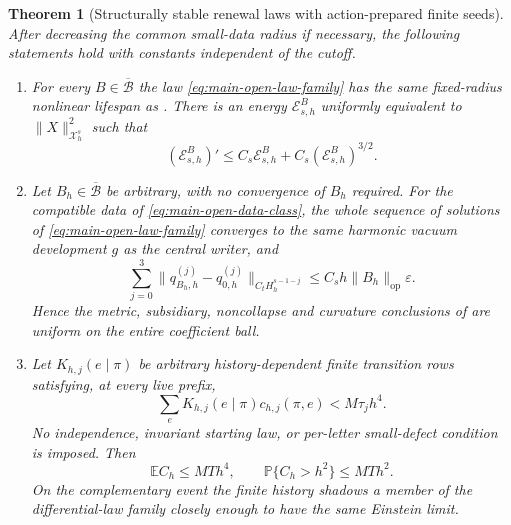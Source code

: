 \documentclass[11pt]{article}
\newtheorem{theorem}{Theorem}[section]
\numberwithin{equation}{section}
\theoremstyle{definition}
\theoremstyle{remark}
\newcommand{\op}{\mathrm{op}}
\begin{document}
\begin{theorem}[Structurally stable renewal laws with action-prepared finite seeds]
\label{thm:main-open-law-basin}
After decreasing the common small-data radius if necessary, the following
statements hold with constants independent of the cutoff.
\begin{enumerate}[label=\textup{(L\arabic*)},leftmargin=3em]
\item For every $B\in\overline{\mathcal B}$ the law
      \eqref{eq:main-open-law-family} has the same fixed-radius nonlinear
      lifespan as .  There is an energy
      $\mathscr E^B_{s,h}$ uniformly equivalent to
      $\|X\|_{\mathcal X_h^s}^2$ such that
      \begin{equation}
       (\mathscr E^B_{s,h})'
       \le C_s\mathscr E^B_{s,h}
          +C_s(\mathscr E^B_{s,h})^{3/2}.
       \label{eq:main-law-energy}
      \end{equation}
\item Let $B_h\in\overline{\mathcal B}$ be arbitrary, with no convergence of
      $B_h$ required.  For the compatible data of
      \eqref{eq:main-open-data-class}, the whole sequence of solutions of
      \eqref{eq:main-open-law-family} converges to the same harmonic vacuum
      development $g$ as the central writer, and
      \begin{equation}
       \sum_{j=0}^3
       \|q_{B_h,h}^{(j)}-q_{0,h}^{(j)}\|_{C_tH_h^{s-1-j}}
          \le C_sh\|B_h\|_{\op}\varepsilon.
       \label{eq:main-law-jet-comparison}
      \end{equation}
      Hence the metric, subsidiary, noncollapse and curvature conclusions of
       are uniform on the entire coefficient ball.
\item Let $K_{h,j}(e\mid\pi)$ be arbitrary history-dependent finite transition
      rows satisfying, at every live prefix,
      \begin{equation}
       \sum_eK_{h,j}(e\mid\pi)c_{h,j}(\pi,e)<M\tau_jh^4.
       \label{eq:main-law-row-moment}
      \end{equation}
      No independence, invariant starting law, or per-letter small-defect
      condition is imposed.  Then
      \begin{equation}
       \mathbb EC_h\le MTh^4,
       \qquad \mathbb P\{C_h>h^2\}\le MTh^2.
       \label{eq:main-law-probability}
      \end{equation}
      On the complementary event the finite history shadows a member of the
      differential-law family closely enough to have the same Einstein limit.

\end{enumerate}
\end{theorem}
\end{document}
